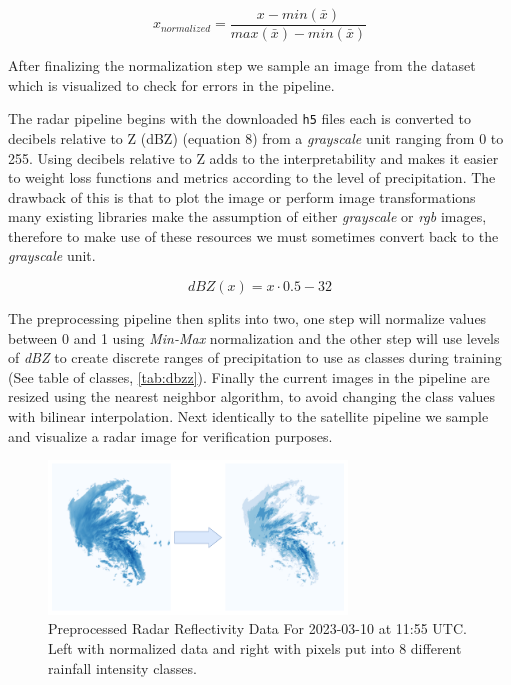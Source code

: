 \begin{equation}
  x_{normalized} = \frac{x-min(\bar{x})}{max(\bar{x})-min(\bar{x})}
\end{equation}

After finalizing the normalization step we sample an image from the dataset which is visualized to check for errors in the pipeline.
\smallskip

The radar pipeline begins with the downloaded \texttt{h5} files
each is converted to decibels relative to Z (dBZ) (equation 8) from a \textit{grayscale} unit ranging from 0 to 255.
Using decibels relative to Z adds to the interpretability  and makes it easier to weight loss functions and metrics
according to the level of precipitation. The drawback of this is that to plot the image or perform image transformations many
existing libraries make the assumption of either \textit{grayscale} or \textit{rgb} images, therefore to make use of these resources we must sometimes convert back to the \textit{grayscale} unit. 

\begin{equation}
  dBZ(x) = x \cdot 0.5 - 32
\end{equation}

The preprocessing pipeline then splits into two, one step will normalize values between 0 and 1 using \textit{Min-Max} normalization and the other step will use levels of \textit{dBZ} to create discrete ranges of precipitation to use as classes during training (See table of classes, \ref{tab:dbzz}).
Finally the current images in the pipeline are resized using the nearest neighbor algorithm, to avoid changing the class values with bilinear interpolation.
Next identically to the satellite pipeline we sample and visualize a radar image for verification purposes.

\begin{figure}
  \centering
  \includegraphics[width=225pt]{./images/bins.png}
  \caption{Preprocessed Radar Reflectivity Data For 2023-03-10 at 11:55 UTC. Left with normalized data and right with pixels put into 8 different rainfall intensity classes.}
  \label{fig:bins}
\end{figure}


